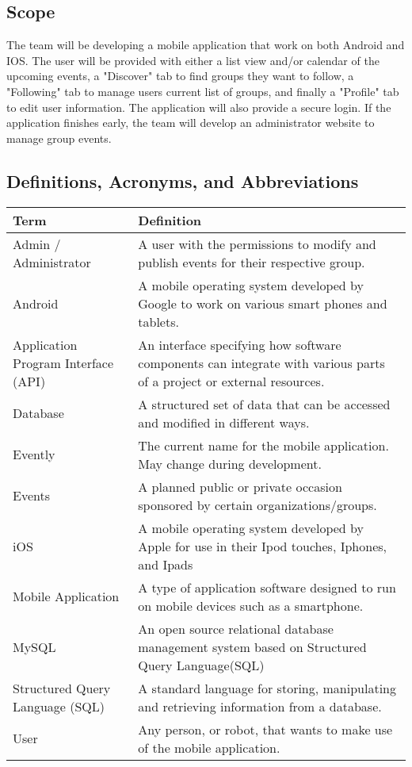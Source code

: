 \documentclass[letterpaper, 10pt,titlepage]{article}
\begin{document}
\subsection{Scope}
The team will be developing a mobile application that work on both Android and IOS. The user will be provided with either a list view and/or calendar of the upcoming events, a "Discover" tab to find groups they want to follow, a "Following" tab to manage users current list of groups, and finally a "Profile" tab to edit user information. The application will also provide a secure login. If the application finishes early, the team will develop an administrator website to manage group events.
\subsection{Definitions, Acronyms, and Abbreviations }
\begin{table}[ht]
\begin{tabular}{| l | p{9cm} |}
\hline
\textbf{Term} & \textbf{Definition} \\ \hline
Admin / Administrator & A user with the permissions to modify and publish events for their respective group. \\ \hline
Android & A mobile operating system developed by Google to work on various smart phones and tablets.\\ \hline
Application Program Interface (API) & An interface specifying how software components can integrate with various parts of a project or external resources. \\ \hline
Database & A structured set of data that can be accessed and modified in different ways.\\ \hline
Evently & The current name for the mobile application. May change during development. \\ \hline
Events & A planned public or private occasion sponsored by certain organizations/groups. \\ \hline
iOS & A mobile operating system developed by Apple for use in their Ipod touches, Iphones, and Ipads \\ \hline
Mobile Application & A type of application software designed to run on mobile devices such as a smartphone. \\ \hline
MySQL & An open source relational database management system based on Structured Query Language(SQL) \\ \hline
Structured Query Language (SQL) & A standard language for storing, manipulating and retrieving information from a database. \\ \hline
User & Any person, or robot, that wants to make use of the mobile application. \\ \hline
\end{tabular}
\end{table}                                                
\end{document}
